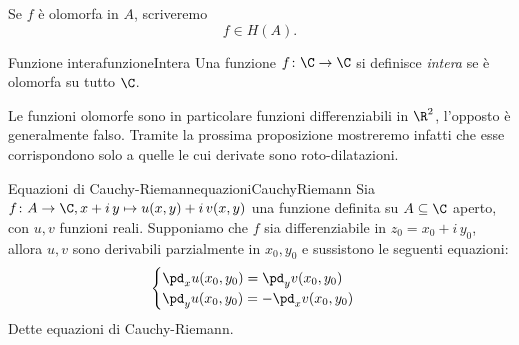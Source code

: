 \begin{notz}
	Se \(f\) è olomorfa in \(A\), scriveremo
	\[
		f\in H(A).
	\]
\end{notz}

\begin{defn}{Funzione intera}{funzioneIntera}
	Una funzione \(f\colon \C \to \C\) si definisce \emph{intera} se è olomorfa su tutto \(\C\).
\end{defn}

\begin{oss}
	Le funzioni olomorfe sono in particolare funzioni differenziabili in \(\R^2\), l'opposto è generalmente falso.
	Tramite la prossima proposizione mostreremo infatti che esse corrispondono solo a quelle le cui derivate sono roto-dilatazioni.
\end{oss}

\begin{prop}{Equazioni di Cauchy-Riemann}{equazioniCauchyRiemann}
	Sia \(f\colon A \to \C, x+i\,y \mapsto u(x,y)+i\,v(x,y)\) una funzione definita su \(A\subseteq \C\) aperto, con \(u,v\) funzioni reali.
	Supponiamo che \(f\) sia differenziabile in \(z_0=x_0+i\,y_0\), allora \(u,v\) sono derivabili parzialmente in \(x_0,y_0\) e sussistono le seguenti equazioni:
	\[
		\begin{cases}
			\pd_x u(x_0,y_0) = \pd_y v(x_0,y_0) \\
			\pd_y u(x_0,y_0) = -\pd_x v(x_0,y_0)
		\end{cases}
	\]
	Dette equazioni di Cauchy-Riemann.
\end{prop}

